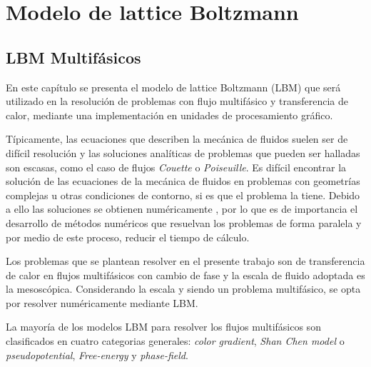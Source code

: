 \chapter{Modelo de lattice Boltzmann}

\graphicspath{{figs/cap2/}}
\label{cap2}

\section{LBM Multifásicos}

En este capítulo se presenta el modelo de lattice Boltzmann (LBM) que será utilizado en la resolución de problemas con flujo multifásico y transferencia de calor, mediante una implementación en unidades de procesamiento gráfico.

Típicamente, las ecuaciones que describen la mecánica de fluidos suelen ser de difícil resolución y las soluciones analíticas de problemas que pueden ser halladas son escasas, como el caso de flujos \textit{Couette} o \textit{Poiseuille}. Es difícil encontrar la solución de las ecuaciones de la mecánica de fluidos en problemas con geometrías complejas u otras condiciones de contorno, si es que el problema la tiene. Debido a ello las soluciones se obtienen numéricamente \cite{kruger2017lattice}, por lo que es de importancia el desarrollo de métodos numéricos que resuelvan los problemas de forma paralela y por medio de este proceso, reducir el tiempo de cálculo.

Los problemas que se plantean resolver en el presente trabajo son de transferencia de calor en flujos multifásicos con cambio de fase y la escala de fluido adoptada es la mesoscópica. Considerando la escala y siendo un problema multifásico, se opta por resolver numéricamente mediante LBM. 


La mayoría de los modelos LBM para resolver los flujos multifásicos son clasificados en cuatro categorias generales: \textit{color gradient}, \textit{Shan Chen model} o \textit{pseudopotential}, \textit{Free-energy} y  \textit{phase-field}. 


